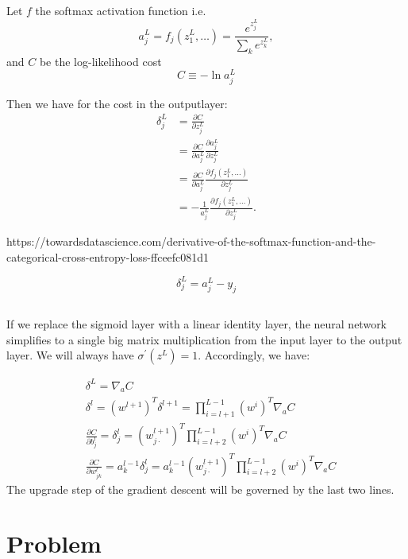 \documentclass{article}
\begin{document}
\subsection{}
Let $f$ the softmax activation function i.e.
$$a_j^L=f_j(z_1^L,\ldots)=\frac{e^{z_j^L}}{\sum_k e^{z_k^L}}, $$
and $C$ be the log-likelihood cost
$$
C \equiv-\ln a_j^L
$$ 

Then we have for the cost in the outputlayer:
$$
\begin{aligned}
	\delta_j^L&=\frac{\partial C}{\partial z_j^L} 
	\\&=\frac{\partial C}{\partial a_j^L}\frac{\partial a_j^L}{\partial z_j^L}
	\\&=\frac{\partial C}{\partial a_j^L}\frac{\partial f_j(z_1^L,\ldots) }{\partial z_j^L}
	\\&=-\frac{1}{a_j^L}\frac{\partial f_j(z_1^L,\ldots) }{\partial z_j^L}.
	\end{aligned}
$$

https://towardsdatascience.com/derivative-of-the-softmax-function-and-the-categorical-cross-entropy-loss-ffceefc081d1

$$
\delta_j^L=a_j^L-y_j
$$

\subsection{}
If we replace the sigmoid layer with a linear identity layer, the neural network simplifies to a single big matrix multiplication from the input layer to the output layer. We will always have $\sigma^{\prime}\left(z^L\right)=1$. Accordingly, we have:

\begin{equation}
\begin{aligned}
& \delta^L=\nabla_a C  \\
& \delta^l=\left(w^{l+1}\right)^T \delta^{l+1}=\prod_{i=l+1}^{L-1} \left(w^i\right)^T \nabla_a C\\
& \frac{\partial C}{\partial b_j^l}=\delta_j^l = \left(w^{l+1}_{j\cdot }\right)^T\prod_{i=l+2}^{L-1} \left(w^i\right)^T \nabla_a C\\
& \frac{\partial C}{\partial w_{j k}^l}=a_k^{l-1} \delta_j^l= a_k^{l-1}\left(w^{l+1}_{j\cdot }\right)^T\prod_{i=l+2}^{L-1} \left(w^i\right)^T \nabla_a C
\end{aligned}
\end{equation}
The upgrade step of the gradient descent will be governed by the last two lines.
\section{Problem}
\end{document}
